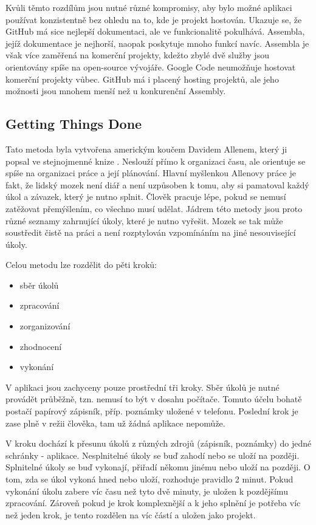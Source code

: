 Kvůli těmto rozdílům jsou nutné různé kompromisy, aby bylo možné aplikaci používat konzistentně bez ohledu na to, kde je projekt hostován. Ukazuje se, že GitHub má sice nejlepší dokumentaci, ale ve funkcionalitě pokulhává. Assembla, jejíž dokumentace je nejhorší, naopak poskytuje mnoho funkcí navíc. Assembla je však více zaměřená na komerční projekty, kdežto zbylé dvě služby jsou orientovány spíše na open-source vývojáře. Google Code neumožňuje hostovat komerční projekty vůbec. GitHub má i placený hosting projektů, ale jeho možnosti jsou mnohem menší než u konkurenční Assembly.

\subsection{Getting Things Done}

Tato metoda byla vytvořena americkým koučem Davidem Allenem, který ji popsal ve stejnojmenné knize \cite{gtd:book}. Neslouží přímo k organizaci času, ale orientuje se spíše na organizaci práce a její plánování. Hlavní myšlenkou Allenovy práce je fakt, že lidský mozek není diář a není uzpůsoben k tomu, aby si pamatoval každý úkol a závazek, který je nutno splnit. Člověk pracuje lépe, pokud se nemusí zatěžovat přemýšlením, co všechno musí udělat. Jádrem této metody jsou proto různé seznamy zahrnující úkoly, které je nutno vyřešit. Mozek se tak může soustředit čistě na práci a není rozptylován vzpomínáním na jiné nesouvisející úkoly.

Celou metodu lze rozdělit do pěti kroků\cite{gtd:wiki}:

\begin{itemize}
\item sběr úkolů
\item zpracování
\item zorganizování
\item zhodnocení
\item vykonání
\end{itemize}

V aplikaci jsou zachyceny pouze prostřední tři kroky. Sběr úkolů je nutné provádět průběžně, tzn. nemusí to být v dosahu počítače. Tomuto účelu bohatě postačí papírový zápisník, příp. poznámky uložené v telefonu. Poslední krok  je zase plně v režii člověka, tam už žádná aplikace nepomůže.

V kroku  dochází k přesunu úkolů z různých zdrojů (zápisník, poznámky) do jedné schránky - aplikace. Nesplnitelné úkoly se buď zahodí nebo se uloží na později. Splnitelné úkoly se buď vykonají, přiřadí někomu jinému nebo uloží na později. O tom, zda se úkol vykoná hned nebo uloží, rozhoduje pravidlo 2 minut. Pokud vykonání úkolu zabere víc času než tyto dvě minuty, je uložen k pozdějšímu zpracování. Zároveň pokud je krok komplexnější a k jeho splnění je potřeba víc než jeden krok, je tento rozdělen na víc částí a uložen jako projekt.

